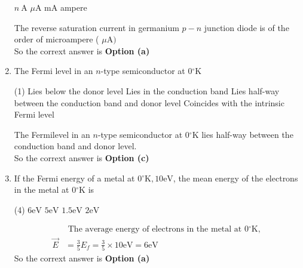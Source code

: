 \begin{enumerate}
\begin{tasks}
		\task[\textbf{a.}]$n \mathrm{~A}$
		\task[\textbf{b.}]$\mu \mathrm{A}$
		\task[\textbf{c.}] $\mathrm{mA}$
		\task[\textbf{d.}] ampere
	\end{tasks}
	\begin{answer}
	The reverse saturation current in germanium $p-n$ junction diode is of the order of microampere ( $\mu \mathrm{A})$\\
		So the corrext answer is \textbf{Option (a)}
	\end{answer}
\item The Fermi level in an $n$-type semiconductor at $0{ }^{\circ} \mathrm{K}$
 \begin{tasks}(1)
	\task[\textbf{a.}]Lies below the donor level
	\task[\textbf{b.}]Lies in the conduction band
	\task[\textbf{c.}]Lies half-way between the conduction band and donor level
	\task[\textbf{d.}] Coincides with the intrinsic Fermi level
\end{tasks}
\begin{answer}
	The Fermilevel in an $n$-type semiconductor at $0{ }^{\circ} \mathrm{K}$ lies half-way between the conduction band and donor level.\\
	So the corrext answer is \textbf{Option (c)}
\end{answer}
\item If the Fermi energy of a metal at $0{ }^{\circ} \mathrm{K}, 10 \mathrm{eV}$, the mean energy of the electrons in the metal at $0{ }^{\circ} \mathrm{K}$ is
 \begin{tasks}(4)
	\task[\textbf{a.}]$6 \mathrm{eV}$
	\task[\textbf{b.}] $5 \mathrm{eV}$
	\task[\textbf{c.}]$1.5 \mathrm{eV}$
	\task[\textbf{d.}]  $2 \mathrm{eV}$
\end{tasks}
\begin{answer}
	$$
	\begin{aligned}
		&\text { The average energy of electrons in the metal at } 0{ }^{\circ} \mathrm{K} \text {, }\\
		\vec{E}&=\frac{3}{5} E_{f}=\frac{3}{5} \times 10 \mathrm{eV}=6 \mathrm{eV}
\end{aligned}
$$
	So the corrext answer is \textbf{Option (a)}
\end{answer}





\end{enumerate}